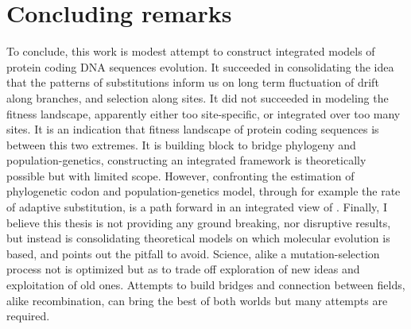 \section{Concluding remarks}
\label{sec:concluding-remarks}

To conclude, this work is modest attempt to construct integrated models of protein coding \acrshort{DNA} sequences evolution.
It succeeded in consolidating the idea that the patterns of \glspl{substitution} inform us on long term fluctuation of drift along branches, and selection along sites.
It did not succeeded in modeling the fitness landscape, apparently either too site-specific, or integrated over too many sites.
It is an indication that fitness landscape of protein coding sequences is between this two extremes.
It is building block to bridge phylogeny and population-genetics, constructing an integrated framework is theoretically possible but with limited scope.
However, confronting the estimation of phylogenetic \gls{codon} and population-genetics model, through for example the rate of adaptive \gls{substitution}, is a path forward in an integrated view of .
Finally, I believe this thesis is not providing any ground breaking, nor disruptive results, but instead is consolidating theoretical models on which molecular evolution is based, and points out the pitfall to avoid.
Science, alike a mutation-selection process not is optimized but as to trade off exploration of new ideas and exploitation of old ones.
Attempts to build bridges and connection between fields, alike \gls{recombination}, can bring the best of both worlds but many attempts are required.